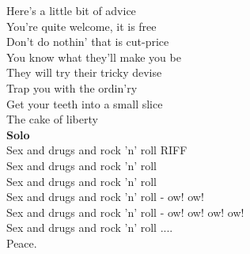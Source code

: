 \documentclass[10pt, twoside, a4paper]{article}
\begin{document}
Here's a little bit of advice \\
You're quite welcome, it is free \\
Don't do nothin' that is cut-price \\
You know what they'll make you be \\
They will try their tricky devise \\
Trap you with the ordin'ry \\
Get your teeth into a small slice \\
The cake of liberty \\

\textbf{Solo} \\

Sex and drugs and rock 'n' roll	\hfill	RIFF \\
Sex and drugs and rock 'n' roll \\
Sex and drugs and rock 'n' roll \\
Sex and drugs and rock 'n' roll - ow! ow! \\
Sex and drugs and rock 'n' roll - ow! ow! ow! ow! \\
Sex and drugs and rock 'n' roll .... \\

Peace. \\
\end{document}
